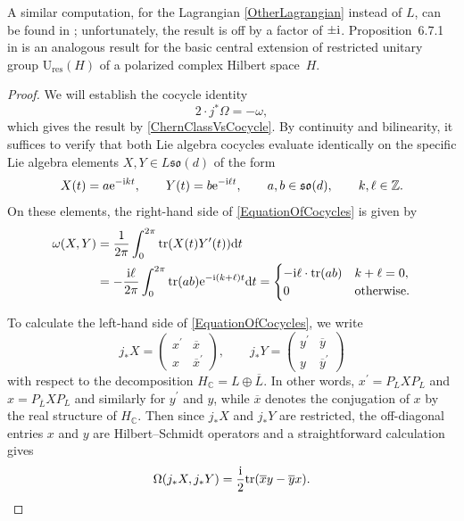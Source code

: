 \documentclass[10pt,a4paper]{amsart}
\numberwithin{equation}{section}
\newcommand{\Z}{\mathbb{Z}}
\newcommand{\C}{\mathbb{C}}
\newcommand{\tr}{\mathrm{tr}}
\newcommand{\res}{\mathrm{res}}
\newcommand{\U}{\mathrm{U}}
\begin{document}
A similar computation, for the Lagrangian \eqref{OtherLagrangian} instead of $L$, can be found in \cite{KristelWaldorf1}; unfortunately, the result is off by a factor of $\pm {\rm i}$.
Proposition~6.7.1 in \cite{PressleySegal} is an analogous result for the basic central extension of restricted unitary group $\U_{\res}(H)$ of a polarized complex Hilbert space~$H$.

\begin{proof}We will establish the cocycle identity
\begin{equation}\label{EquationOfCocycles}
 2 \cdot j^*\Omega = -\omega,	
\end{equation}
which gives the result by \eqref{ChernClassVsCocycle}.
By continuity and bilinearity, it suffices to verify that both Lie algebra cocycles evaluate identically on the specific Lie algebra elements $X,Y \in L\mathfrak{so}(d)$ of the form
\begin{equation*}
	X(t) = a {\rm e}^{-{\rm i}kt}, \qquad Y(t) = b {\rm e}^{-{\rm i}\ell t}, \qquad a, b \in \mathfrak{so}(d), \qquad k, \ell \in \Z.
\end{equation*}
On these elements, the right-hand side of \eqref{EquationOfCocycles} is given by
\begin{align}
 \omega(X, Y) &= \frac{1}{2\pi}\int_0^{2\pi} \tr(X(t) Y^\prime(t)) {\rm d}t
 \nonumber\\
 &= -\frac{{\rm i}\ell}{2\pi}\int_0^{2\pi} \tr(ab) {\rm e}^{-{\rm i}(k+\ell)t} {\rm d}t
 = \begin{cases} -{\rm i}\ell \cdot \tr(ab) & k+\ell = 0, \\ 0 & \text{otherwise}.
 \end{cases}\label{ToCompareWithOmega}
\end{align}

To calculate the left-hand side of \eqref{EquationOfCocycles}, we write
	\begin{equation*}
 j_*X =
 \begin{pmatrix}
 	x^\prime & \overline{x} \\ x & \overline{x}^\prime
 \end{pmatrix},	
 \qquad
 j_*Y =
 \begin{pmatrix}
 	y^\prime & \overline{y} \\ y & \overline{y}^\prime
 \end{pmatrix}	
\end{equation*}
with respect to the decomposition $H_\C = L \oplus \overline{L}$.
In other words, $x^\prime = P_LXP_L$ and $x = P_{\overline{L}}XP_L$ and similarly for $y^\prime$ and $y$, while $\overline{x}$ denotes the conjugation of $x$ by the real structure of $H_\C$.
Then since $j_*X$ and $j_*Y$ are restricted, the off-diagonal entries $x$ and $y$ are Hilbert--Schmidt operators and a straightforward calculation gives
\begin{equation}
\label{ReformulatedOmega}
 \Omega(j_*X, j_*Y) = \frac{{\rm i}}{2} \tr(\overline{x} y - \overline{y}x).	
\end{equation}


\end{proof}
\end{document}
